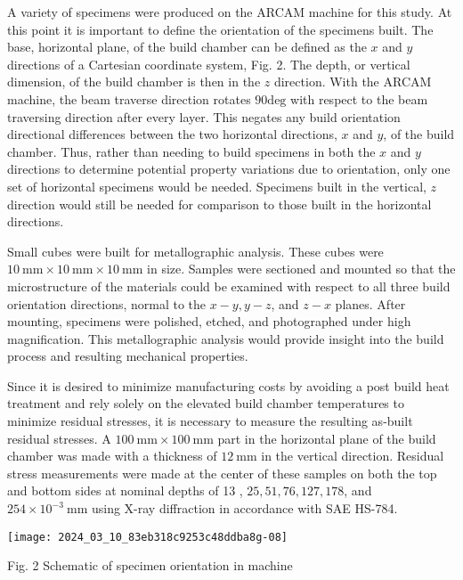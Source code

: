 \documentclass[10pt]{article}
\begin{document}
A variety of specimens were produced on the ARCAM machine for this study. At this point it is important to define the orientation of the specimens built. The base, horizontal plane, of the build chamber can be defined as the $x$ and $y$ directions of a Cartesian coordinate system, Fig. 2. The depth, or vertical dimension, of the build chamber is then in the $z$ direction. With the ARCAM machine, the beam traverse direction rotates $90 \mathrm{deg}$ with respect to the beam traversing direction after every layer. This negates any build orientation directional differences between the two horizontal directions, $x$ and $y$, of the build chamber. Thus, rather than needing to build specimens in both the $x$ and $y$ directions to determine potential property variations due to orientation, only one set of horizontal specimens would be needed. Specimens built in the vertical, $z$ direction would still be needed for comparison to those built in the horizontal directions.

Small cubes were built for metallographic analysis. These cubes were $10 \mathrm{~mm} \times 10 \mathrm{~mm} \times 10 \mathrm{~mm}$ in size. Samples were sectioned and mounted so that the microstructure of the materials could be examined with respect to all three build orientation directions, normal to the $x-y, y-z$, and $z-x$ planes. After mounting, specimens were polished, etched, and photographed under high magnification. This metallographic analysis would provide insight into the build process and resulting mechanical properties.

Since it is desired to minimize manufacturing costs by avoiding a post build heat treatment and rely solely on the elevated build chamber temperatures to minimize residual stresses, it is necessary to measure the resulting as-built residual stresses. A $100 \mathrm{~mm} \times 100 \mathrm{~mm}$ part in the horizontal plane of the build chamber was made with a thickness of $12 \mathrm{~mm}$ in the vertical direction. Residual stress measurements were made at the center of these samples on both the top and bottom sides at nominal depths of 13 , $25,51,76,127,178$, and $254 \times 10^{-3} \mathrm{~mm}$ using X-ray diffraction in accordance with SAE HS-784.

\begin{center}
\texttt{[image: 2024\_03\_10\_83eb318c9253c48ddba8g-08]}
\end{center}

Fig. 2 Schematic of specimen orientation in machine
\end{document}
